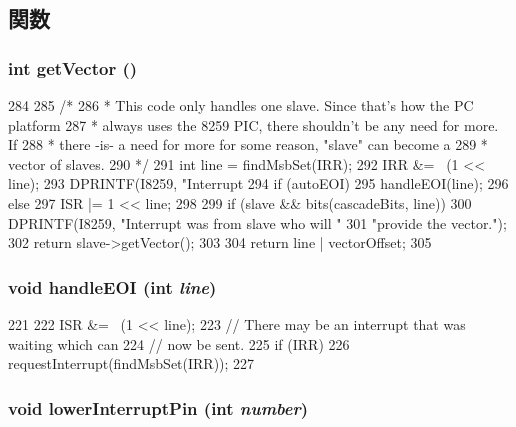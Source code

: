 \subsection{関数}
\hypertarget{classX86ISA_1_1I8259_a26bce2cbf4beafc63b23e5d0fbf140b8}{
\subsubsection[{getVector}]{\setlength{\rightskip}{0pt plus 5cm}int getVector ()}}
\label{classX86ISA_1_1I8259_a26bce2cbf4beafc63b23e5d0fbf140b8}



\begin{DoxyCode}
284 {
285     /*
286      * This code only handles one slave. Since that's how the PC platform
287      * always uses the 8259 PIC, there shouldn't be any need for more. If
288      * there -is- a need for more for some reason, "slave" can become a
289      * vector of slaves.
290      */
291     int line = findMsbSet(IRR);
292     IRR &= ~(1 << line);
293     DPRINTF(I8259, "Interrupt %
294     if (autoEOI) {
295         handleEOI(line);
296     } else {
297         ISR |= 1 << line;
298     }
299     if (slave && bits(cascadeBits, line)) {
300         DPRINTF(I8259, "Interrupt was from slave who will "
301                 "provide the vector.\n");
302         return slave->getVector();
303     }
304     return line | vectorOffset;
305 }
\end{DoxyCode}
\hypertarget{classX86ISA_1_1I8259_a98fd3afbe3f7046e1b5d9d9f928b8482}{
\subsubsection[{handleEOI}]{\setlength{\rightskip}{0pt plus 5cm}void handleEOI (int {\em line})}}
\label{classX86ISA_1_1I8259_a98fd3afbe3f7046e1b5d9d9f928b8482}



\begin{DoxyCode}
221 {
222     ISR &= ~(1 << line);
223     // There may be an interrupt that was waiting which can
224     // now be sent.
225     if (IRR)
226         requestInterrupt(findMsbSet(IRR));
227 }
\end{DoxyCode}
\hypertarget{classX86ISA_1_1I8259_a41406df644356ee1578b77b1acd18042}{
\subsubsection[{lowerInterruptPin}]{\setlength{\rightskip}{0pt plus 5cm}void lowerInterruptPin (int {\em number})}}
\label{classX86ISA_1_1I8259_a41406df644356ee1578b77b1acd18042}


